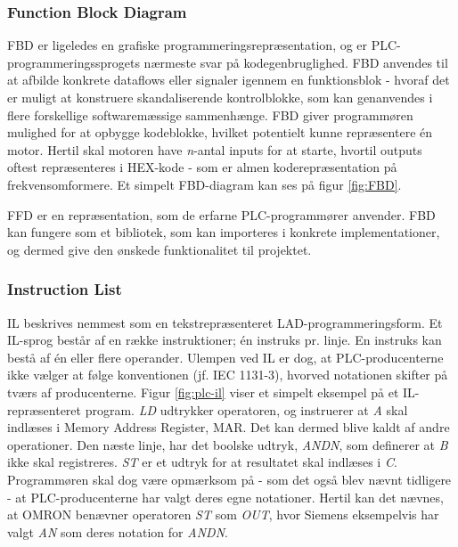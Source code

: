 \subsubsection{Function Block Diagram}
FBD er ligeledes en grafiske programmeringsrepræsentation, og er PLC-programmeringssprogets nærmeste svar på kodegenbruglighed. FBD anvendes til at afbilde konkrete dataflows eller signaler igennem en funktionsblok - hvoraf det er muligt at konstruere skandaliserende kontrolblokke, som kan genanvendes i flere forskellige softwaremæssige sammenhænge. FBD giver programmøren mulighed for at opbygge kodeblokke, hvilket potentielt kunne repræsentere én motor. Hertil skal motoren have \textit{n}-antal inputs for at starte, hvortil outputs oftest repræsenteres i HEX-kode - som er almen koderepræsentation på frekvensomformere. Et simpelt FBD-diagram kan ses på figur \ref{fig:FBD}.


\noindent FFD er en repræsentation, som de erfarne PLC-programmører anvender. FBD kan fungere som et bibliotek, som kan importeres i konkrete implementationer, og dermed give den ønskede funktionalitet til projektet. \cite{FDB_desc}

\subsubsection{Instruction List}
IL beskrives nemmest som en tekstrepræsenteret LAD-programmeringsform. Et IL-sprog består af en række instruktioner; én instruks pr. linje. En instruks kan bestå af én eller flere operander. Ulempen ved IL er dog, at PLC-producenterne ikke vælger at følge konventionen (jf. IEC 1131-3), hvorved notationen skifter på tværs af producenterne. Figur \ref{fig:plc-il} viser et simpelt eksempel på et IL-repræsenteret program. \textit{LD} udtrykker operatoren, og instruerer at \textit{A} skal indlæses i Memory Address Register, MAR. Det kan dermed blive kaldt af andre operationer. Den næste linje, har det boolske udtryk, \textit{ANDN}, som definerer at \textit{B} ikke skal registreres. \textit{ST} er et udtryk for at resultatet skal indlæses i \textit{C}. Programmøren skal dog være opmærksom på - som det også blev nævnt tidligere - at PLC-producenterne har valgt deres egne notationer. Hertil kan det nævnes, at OMRON benævner operatoren \textit{ST} som \textit{OUT}, hvor Siemens eksempelvis har valgt \textit{AN} som deres notation for \textit{ANDN}. \cite{FDB_desc}

